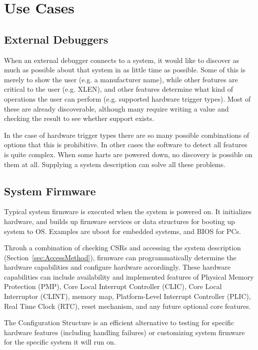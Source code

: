 \section{Use Cases}

\subsection{External Debuggers}

When an external debugger connects to a system, it would like to discover as
much as possible about that system in as little time as possible. Some of this
is merely to show the user (e.g. a manufacturer name), while other features are
critical to the user (e.g. XLEN), and other features determine what kind of
operations the user can perform (e.g. supported hardware trigger types). Most
of these are already discoverable, although many require writing a value and
checking the result to see whether support exists.

In the case of hardware trigger types there are so many possible combinations
of options that this is prohibitive. In other cases the software to detect all
features is quite complex. When some harts are powered down, no discovery is
possible on them at all. Supplying a system description can solve all these
problems.

\subsection{System Firmware}

Typical system firmware is executed when the system is powered on. It
initializes hardware, and builds up firmware services or data structures for
booting up system to OS. Examples are uboot for embedded systems, and BIOS for
PCs.

Throuh a combination of checking CSRs and
accessing the system description (Section~\ref{sec:AccessMethod}), firmware
can programmatically determine the hardware capabilities and configure hardware
accordingly.  These hardware capabilities can include availability and
implemented features of Physical Memory Protection (PMP), Core Local Interrupt
Controller (CLIC), Core Local Interruptor (CLINT), memory map, Platform-Level
Interrupt Controller (PLIC), Real Time Clock (RTC), reset mechanism, and any
future optional core features.

The Configuration Structure is an efficient alternative to testing for specific
hardware features (including handling failures) or customizing system firmware
for the specific system it will run on.

